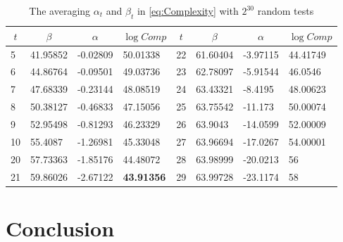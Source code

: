 \begin{table}[htbp]
  \centering
  \caption{The averaging $\alpha_t$ and $\beta_t$ in \eqref{eq:Complexity} with $2^{30}$ random tests}\label{tab:AlphaAndBeta}
    \begin{tabular}{|l|l|l|l|l|l|l|l|}
    \hline
    \multicolumn{1}{|c|}{$t$} & \multicolumn{1}{c|}{$\beta$} & \multicolumn{1}{c|}{$\alpha$} & \multicolumn{1}{c|}{$\log Comp$} & \multicolumn{1}{c|}{$t$} & \multicolumn{1}{c|}{$\beta$} & \multicolumn{1}{c|}{$\alpha$} & \multicolumn{1}{c|}{$\log Comp$} \\
    \hline

    5    & 41.95852 & -0.02809 & 50.01338 & 22    & 61.60404 & -3.97115 & 44.41749 \\
    \hline
    6    & 44.86764 & -0.09501 & 49.03736 & 23    & 62.78097 & -5.91544 & 46.0546 \\
    \hline
    7    & 47.68339 & -0.23144 & 48.08519 & 24    & 63.43321 & -8.4195 & 48.00623 \\
    \hline
    8    & 50.38127 & -0.46833 & 47.15056 & 25    & 63.75542 & -11.173 & 50.00074 \\
    \hline
    9    & 52.95498 & -0.81293 & 46.23329 & 26    & 63.9043 & -14.0599 & 52.00009 \\
    \hline
    10    & 55.4087 & -1.26981 & 45.33048 & 27    & 63.96694 & -17.0267 & 54.00001 \\
    \hline
    20    & 57.73363 & -1.85176 & 44.48072 & 28    & 63.98999 & -20.0213 & 56 \\
    \hline
    21    & 59.86026 & -2.67122 & \textbf{43.91356} & 29    & 63.99728 & -23.1174 & 58 \\
    \hline

    \end{tabular}%
  \label{tab:Example2}%
\end{table}%





\section{Conclusion}





\ifLNCSVER
  
\else
  
\fi





\ifLNCSVER

\else

\fi





